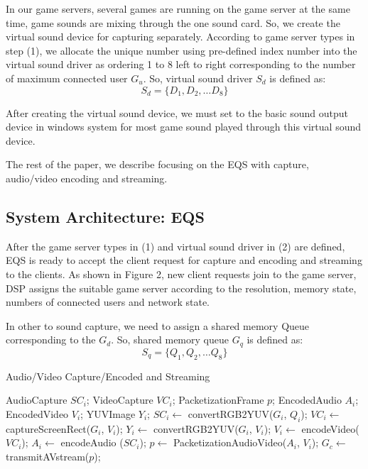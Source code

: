 \documentclass[twocolumn]{article}
\begin{document}
In our game servers, several games are running on the game server at the same time, game sounds are mixing through the one sound card. 
So, we create the virtual sound device for capturing separately. According to game server types in step (1), we allocate the unique number using pre-defined index number into the virtual sound driver as ordering 1 to 8 left to right corresponding to the number of maximum connected user $G_u$. So, virtual sound driver $S_d$ is defined as:
\begin{equation}
S_d = \{ D_1, D_2, \dots D_8\} 
\end{equation}

After creating the virtual sound device, we must set to the basic sound output device in windows system for most game sound played through this virtual sound device. 

The rest of the paper, we describe focusing on the EQS with capture, audio/video encoding and streaming.


\subsection{System Architecture: EQS}
After the game server types in (1) and virtual sound driver in (2) are defined, EQS is ready to accept the client request for capture and encoding and streaming to the clients. As shown in  Figure 2, new client requests join to the game server, DSP assigns the suitable game server according to the resolution, memory state, numbers of connected users and network state. 

In other to sound capture, we need to assign a shared memory Queue corresponding to the $G_d$. So, shared memory queue $G_q$ is defined as:
\begin{equation}
S_q = \{ Q_1, Q_2, … Q_8\}  
\end{equation}
    \begin{algorithm}
    \caption{Audio/Video Capture/Encoded and Streaming}
    \label{algo:encoding}
    \begin{algorithmic}[1]
       \State AudioCapture  $SC_i$;
       \State VideoCapture  $VC_i$;
       \State PacketizationFrame  $p$;
       \State EncodedAudio $A_i$;
       \State EncodedVideo $V_i$;
       \State YUVImage  $Y_i$;	
          \State $SC_i \gets$ convertRGB2YUV($G_i$, $Q_i$);
          \State $VC_i \gets$ captureScreenRect($G_i$,  $V_i$);
	\State $Y_i \gets$ convertRGB2YUV($G_i$,  $V_i$);
	\State $V_i \gets$ encodeVideo($VC_i$);
	\State $A_i \gets$ encodeAudio ($SC_i$);
	\State $p \gets$ PacketizationAudioVideo($A_i$, $V_i$);
	\State $G_c \gets$ transmitAVstream($p$);
       \EndWhile
    \EndProcedure
    \end{algorithmic}
    \end{algorithm}
\end{document}
